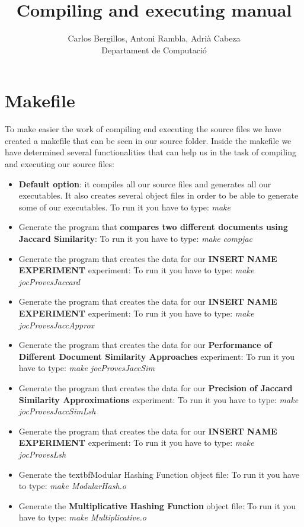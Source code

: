 \documentclass[12pt]{article}
\author{Carlos Bergillos, Antoni Rambla, Adrià Cabeza\\ Departament de Computació}
\title{Compiling and executing manual}
\begin{document}
  \maketitle  
   \newpage
   \section{Makefile}
   To make easier the work of compiling end executing the source files we have created a makefile that can be seen in our source folder. Inside the makefile we have determined several functionalities that can help us in the task of compiling and executing our source files:
   
   \begin{itemize}
   \item \textbf{Default option}: it compiles all our source files and generates all our executables. It also creates several object files in order to be able to generate some of our executables. 
   To run it you have to type: \textit{make}
   \item Generate the program that \textbf{compares two different documents using Jaccard Similarity}:
   To run it you have to type: \textit{make compjac}
\item Generate the program that creates the data for our \textbf{INSERT NAME EXPERIMENT} experiment:
   To run it you have to type: \textit{make jocProvesJaccard}
 \item Generate the program that creates the data for our \textbf{INSERT NAME EXPERIMENT} experiment:
   To run it you have to type: \textit{make jocProvesJaccApprox}
\item Generate the program that creates the data for our \textbf{Performance of Different Document Similarity Approaches} experiment:
   To run it you have to type: \textit{make jocProvesJaccSim}
   \item Generate the program that creates the data for our \textbf{Precision of Jaccard Similarity Approximations} experiment:
   To run it you have to type: \textit{make jocProvesJaccSimLsh}
    \item Generate the program that creates the data for our \textbf{INSERT NAME EXPERIMENT} experiment:
   To run it you have to type: \textit{make jocProvesLsh}
   \item Generate the textbf{Modular Hashing Function} object file:
   To run it you have to type: \textit{make ModularHash.o} 
   \item Generate the \textbf{Multiplicative Hashing Function} object file:
   To run it you have to type: \textit{make Multiplicative.o}

\end{itemize}
\end{document}
